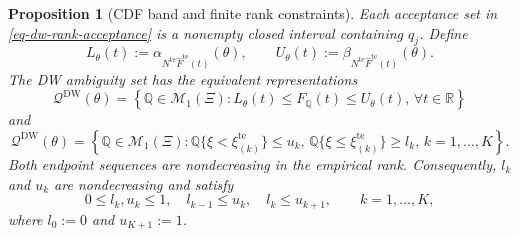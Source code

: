 \documentclass[review,11pt,3p,authoryear,nopreprintline]{elsarticle}
\newtheorem{proposition}{Proposition}
\begin{document}
\begin{proposition}[CDF band and finite rank constraints]
  \label{prop-finite-rank-constraints}
  Each acceptance set in \eqref{eq-dw-rank-acceptance} is a nonempty closed interval containing $q_j$. Define
  \[
    L_\theta(t):=\alpha_{N^{\mathrm{te}}\widehat F^{\mathrm{te}}(t)}(\theta),
    \qquad
    U_\theta(t):=\beta_{N^{\mathrm{te}}\widehat F^{\mathrm{te}}(t)}(\theta).
  \]
  The DW ambiguity set has the equivalent representations
  \begin{equation}
    \mathcal Q^{\mathrm{DW}}(\theta) =\left\{\mathbb Q\in\mathcal M_1(\Xi): L_\theta(t)\le F_{\mathbb Q}(t)\le U_\theta(t), \, \forall t\in\mathbb R\right\}
    \label{eq-dw-band-representation}
  \end{equation}
  and
  \begin{equation}
    \mathcal Q^{\mathrm{DW}}(\theta)
    =\left\{\mathbb Q\in\mathcal M_1(\Xi): \mathbb Q\{\xi<\xi_{(k)}^{\mathrm{te}}\}\le u_k, \, \mathbb Q\{\xi\le \xi_{(k)}^{\mathrm{te}}\}\ge l_k, \, k=1,\ldots,K \right\}.
    \label{eq-finite-rank-constraints}
  \end{equation}
  Both endpoint sequences are nondecreasing in the empirical rank. Consequently, $l_k$ and $u_k$ are nondecreasing and satisfy
  \begin{equation}
    0\le l_k,u_k\le1,\quad
    l_{k-1}\le u_k,\quad
    l_k\le u_{k+1},
    \qquad k=1,\ldots,K,
    \label{eq-rank-compatibility}
  \end{equation}
  where $l_0:=0$ and $u_{K+1}:=1$.
\end{proposition}
\end{document}
